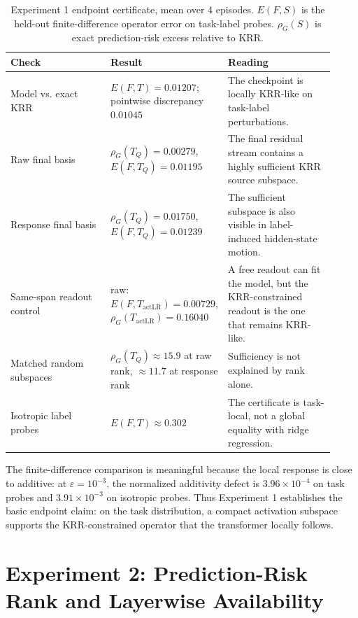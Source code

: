 \documentclass[11pt]{article}
\begin{document}
\begin{table}[htbp]
\centering
\caption{Experiment 1 endpoint certificate, mean over 4 episodes. \(E(F,S)\) is the held-out
finite-difference operator error on task-label probes. \(\rho_G(S)\) is exact prediction-risk excess
relative to KRR.}
\small
\setlength{\tabcolsep}{4pt}
\begin{tabular}{@{}p{0.30\linewidth}p{0.30\linewidth}p{0.32\linewidth}@{}}
\toprule
Check & Result & Reading\\
\midrule
Model vs. exact KRR &
\(E(F,T)=0.01207\); pointwise discrepancy \(0.01045\) &
The checkpoint is locally KRR-like on task-label perturbations.\\
Raw final basis &
\(\rho_G(T_Q)=0.00279\), \(E(F,T_Q)=0.01195\) &
The final residual stream contains a highly sufficient KRR source subspace.\\
Response final basis &
\(\rho_G(T_Q)=0.01750\), \(E(F,T_Q)=0.01239\) &
The sufficient subspace is also visible in label-induced hidden-state motion.\\
Same-span readout control &
raw: \(E(F,T_{\mathrm{actLR}})=0.00729\), \(\rho_G(T_{\mathrm{actLR}})=0.16040\) &
A free readout can fit the model, but the KRR-constrained readout is the one that remains KRR-like.\\
Matched random subspaces &
\(\rho_G(T_Q)\approx15.9\) at raw rank, \(\approx11.7\) at response rank &
Sufficiency is not explained by rank alone.\\
Isotropic label probes &
\(E(F,T)\approx0.302\) &
The certificate is task-local, not a global equality with ridge regression.\\
\bottomrule
\end{tabular}
\end{table}

The finite-difference comparison is meaningful because the local response is close to additive:
at \(\varepsilon=10^{-3}\), the normalized additivity defect is \(3.96\times10^{-4}\) on task probes
and \(3.91\times10^{-3}\) on isotropic probes. Thus Experiment 1 establishes the basic endpoint
claim: on the task distribution, a compact activation subspace supports the KRR-constrained
operator that the transformer locally follows.

\FloatBarrier

\section{Experiment 2: Prediction-Risk Rank and Layerwise Availability}
\end{document}
